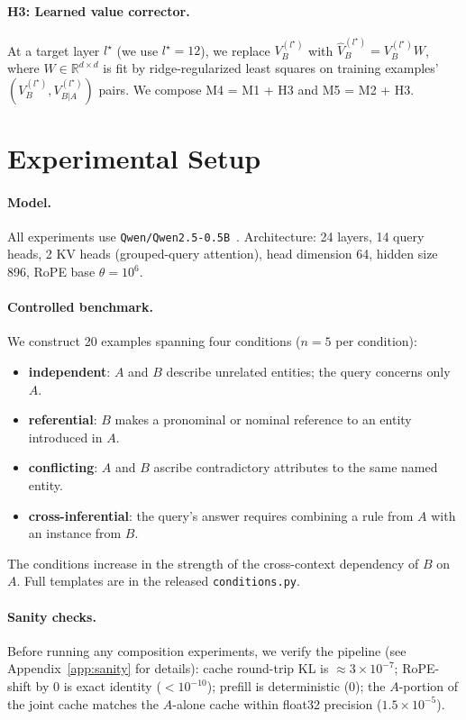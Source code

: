 \documentclass[11pt]{article}
\begin{document}
\paragraph{H3: Learned value corrector.} At a target layer $l^\star$ (we use $l^\star = 12$), we replace $V^{(l^\star)}_B$ with $\hat V^{(l^\star)}_B = V^{(l^\star)}_B W$, where $W \in \mathbb{R}^{d \times d}$ is fit by ridge-regularized least squares on training examples' $(V^{(l^\star)}_B, V^{(l^\star)}_{B|A})$ pairs. We compose M4 = M1 + H3 and M5 = M2 + H3.

\section{Experimental Setup}

\paragraph{Model.} All experiments use \texttt{Qwen/Qwen2.5-0.5B}~\citep{qwen2025qwen25}. Architecture: 24 layers, 14 query heads, 2 KV heads (grouped-query attention), head dimension 64, hidden size 896, RoPE base $\theta = 10^6$.

\paragraph{Controlled benchmark.} We construct 20 examples spanning four conditions ($n=5$ per condition):
\begin{itemize}[leftmargin=*]
    \item \textbf{independent}: $A$ and $B$ describe unrelated entities; the query concerns only $A$.
    \item \textbf{referential}: $B$ makes a pronominal or nominal reference to an entity introduced in $A$.
    \item \textbf{conflicting}: $A$ and $B$ ascribe contradictory attributes to the same named entity.
    \item \textbf{cross-inferential}: the query's answer requires combining a rule from $A$ with an instance from $B$.
\end{itemize}
The conditions increase in the strength of the cross-context dependency of $B$ on $A$. Full templates are in the released \texttt{conditions.py}.

\paragraph{Sanity checks.} Before running any composition experiments, we verify the pipeline (see Appendix~\ref{app:sanity} for details): cache round-trip KL is $\approx 3\times10^{-7}$; RoPE-shift by 0 is exact identity ($< 10^{-10}$); prefill is deterministic ($0$); the $A$-portion of the joint cache matches the $A$-alone cache within float32 precision ($1.5\times10^{-5}$).
\end{document}
